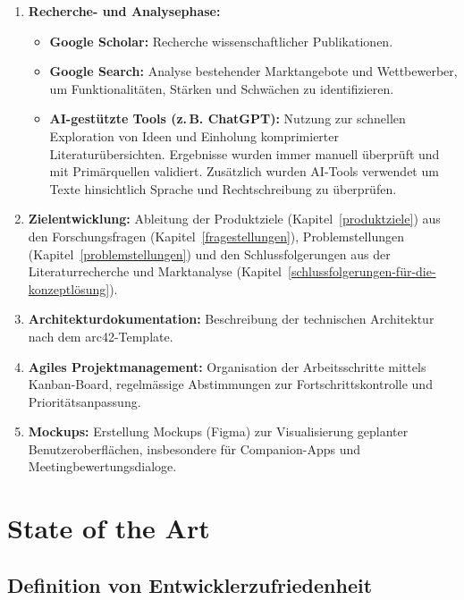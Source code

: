 \documentclass[12pt,a4paper]{report}
\begin{document}
\begin{enumerate}
  \item \textbf{Recherche- und Analysephase:} 
    \begin{itemize}
      \item \textbf{Google Scholar:} Recherche wissenschaftlicher Publikationen.
      \item \textbf{Google Search:} Analyse bestehender Marktangebote und Wettbewerber, um Funktionalitäten, Stärken und
        Schwächen zu identifizieren.
      \item \textbf{AI-gestützte Tools (z.\,B. ChatGPT):} Nutzung zur schnellen Exploration von Ideen und Einholung komprimierter
        Literaturübersichten. Ergebnisse wurden immer manuell überprüft und mit Primärquellen validiert. Zusätzlich wurden 
        AI-Tools verwendet um Texte hinsichtlich Sprache und Rechtschreibung zu überprüfen.
    \end{itemize}

  \item \textbf{Zielentwicklung:} Ableitung der Produktziele (Kapitel~\ref{produktziele}) aus den Forschungsfragen 
    (Kapitel~\ref{fragestellungen}), Problemstellungen (Kapitel~\ref{problemstellungen}) und den Schlussfolgerungen aus der
    Literaturrecherche und Marktanalyse (Kapitel~\ref{schlussfolgerungen-für-die-konzeptlösung}).

  \item \textbf{Architekturdokumentation:} Beschreibung der technischen Architektur nach dem arc42-Template.

  \item \textbf{Agiles Projektmanagement:} Organisation der Arbeitsschritte mittels Kanban-Board, regelmässige Abstimmungen zur
    Fortschrittskontrolle und Prioritätsanpassung.

  \item \textbf{Mockups:} Erstellung Mockups (Figma) zur Visualisierung geplanter Benutzeroberflächen, insbesondere für
    Companion-Apps und Meetingbewertungsdialoge.
\end{enumerate}

\chapter{State of the Art}

\section{Definition von Entwicklerzufriedenheit}
\end{document}
